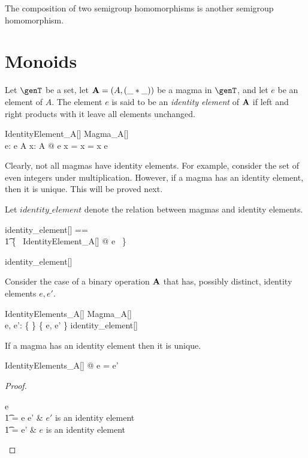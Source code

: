\documentclass{amsart}
\begin{document}
\begin{remark}
The composition of two semigroup homomorphisms is another semigroup homomorphism.
\end{remark}

\section{Monoids}

Let $\genT$ be a set, let $\mathbf{A} = (A, (\_ \mathbin{*} \_))$ be a magma in $\genT$, and let $e$ be an element of $A$.
The element $e$ is said to be an \textit{identity element} of $\mathbf{A}$ if left and right 
products with it leave all elements unchanged.

\begin{schema}{IdentityElement\_A}[\genT]
	Magma\_A[\genT] \\
	e: \genT
\where
	e \in A
\also
	\forall x: A @ e \mulA x = x = x \mulA e
\end{schema}

Clearly, not all magmas have identity elements.
For example, consider the set of even integers under multiplication.
However, if a magma has an identity element, then it is unique.
This will be proved next.

Let $identity\_element$ denote the relation between magmas and identity elements.
\begin{zed}
	identity\_element[\genT] == \\
	\t1	\{~ IdentityElement\_A[\genT] @ \strucA \mapsto e ~\}
\end{zed}

\begin{remark}
\begin{zed}
	identity\_element[\setT] \in \magma \setT \rel \setT
\end{zed}
\end{remark}

Consider the case of a binary operation $\mathbf{A}$ that has, possibly distinct, identity elements $e, e'$.
\begin{schema}{IdentityElements\_A}[\genT]
	Magma\_A[\genT] \\
	e, e': \genT
\where
	\{ \strucA \} \cross \{ e, e' \} \subseteq identity\_element[\genT]
\end{schema}

\begin{remark}
If a magma has an identity element then it is unique.

\begin{zed}
	\forall IdentityElements\_A[\setT] @ e = e'
\end{zed}

\begin{proof}
\begin{argue}
e \\
\t1	= e \mulA e'	& $e'$ is an identity element \\
\t1	= e'			& $e$ is an identity element
\end{argue}
\end{proof}

\end{remark}
\end{document}
